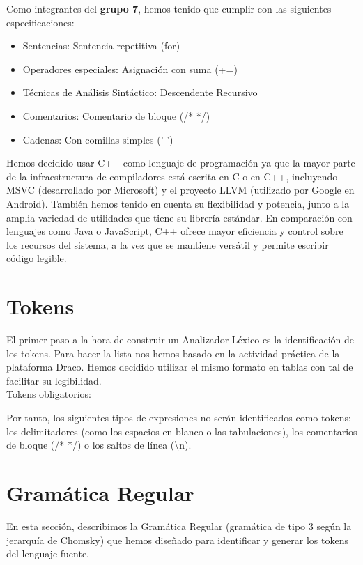 \documentclass{article}
\begin{document}
Como integrantes del \textbf{grupo 7}, hemos tenido que cumplir con las siguientes especificaciones: 
\begin{itemize}[left=2cm]
    \item Sentencias: Sentencia repetitiva (for)
    \item Operadores especiales: Asignación con suma (+=)
    \item Técnicas de Análisis Sintáctico: Descendente Recursivo
    \item Comentarios: Comentario de bloque (/* */)
    \item Cadenas: Con comillas simples (' ')
\end{itemize}

Hemos decidido usar C++ como lenguaje de programación ya que la mayor parte de la infraestructura de compiladores está escrita en C o en C++, incluyendo MSVC (desarrollado por Microsoft) y el proyecto LLVM (utilizado por Google en Android). También hemos tenido en cuenta su flexibilidad y potencia, junto a la amplia variedad de utilidades que tiene su librería estándar. En comparación con lenguajes como Java o JavaScript, C++ ofrece mayor eficiencia y control sobre los recursos del sistema, a la vez que se mantiene versátil y permite escribir código legible.

\newpage

\section{Tokens}
El primer paso a la hora de construir un Analizador Léxico es la identificación de los tokens. Para hacer la lista nos hemos basado en la actividad práctica de la plataforma Draco. Hemos decidido utilizar el mismo formato en tablas con tal de facilitar su legibilidad.\\
Tokens obligatorios:



Por tanto, los siguientes tipos de expresiones no serán identificados como tokens: los delimitadores (como los espacios en blanco o las tabulaciones), los comentarios de bloque (/* */) o los saltos de línea (\textbackslash n).

\section{Gramática Regular}

En esta sección, describimos la Gramática Regular (gramática de tipo 3 según la jerarquía de Chomsky) que hemos diseñado para identificar y generar los tokens del lenguaje fuente. 
\end{document}
